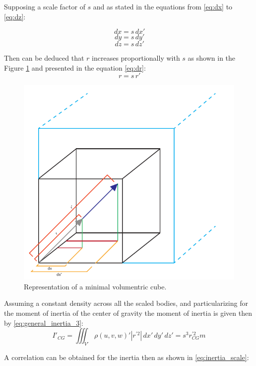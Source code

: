 Supposing a scale factor of $s$ and as stated in the equations from \ref{eq:dx} to \ref{eq:dz}:

\begin{multicols}{3}
  \begin{equation}
  \label{eq:dx}
    \,dx=s \,dx'
  \end{equation}\break
  \begin{equation}
  \label{eq:dy}
    \,dy=s \,dy'
  \end{equation}\break
  \begin{equation}
  \label{eq:dz}
    \,dz=s \,dz'
  \end{equation}\break
\end{multicols}

Then can be deduced that $r$ increases proportionally with $s$ as shown in the Figure \ref{fig:dimensional_analysis} and presented in the equation \ref{eq:dr}:
\begin{equation}
  \label{eq:dr}
  \,r=s \,r'
\end{equation}

\begin{figure}[ht!]
  \centering
  \includegraphics[width=0.5\linewidth]{figures/dimensional_analysis.pdf}
  \caption{Representation of a minimal volumentric cube.}
  \label{fig:dimensional_analysis}
\end{figure}

Assuming a constant density across all the scaled bodies, and particularizing for the moment of inertia of the center of gravity the moment of inertia is given then by \ref{eq:general_inertia_3}:
\begin{equation}
  \label{eq:general_inertia_3}
  I'_{CG} = \iiint_{V'} \rho(u,v,w)' |r^{'2}| \,dx'\,dy'\,dz' = s^{3} r_{CG}^{'2} m
\end{equation}

A correlation can be obtained for the inertia then as shown in \ref{eq:inertia_scale}:

